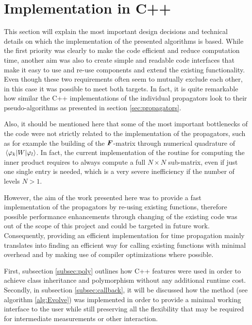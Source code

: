 \section{Implementation in C++}
\label{sec:implementation}
%
This section will explain the most important design decisions and technical details on which the implementation of the presented algorithms is based.
While the first priority was clearly to make the code efficient and reduce computation time, another aim was also to create simple and readable code interfaces that make it easy to use and re-use components and extend the existing functionality. \\
%
Even though these two requirements often seem to mutually exclude each other, in this case it was possible to meet both targets.
In fact, it is quite remarkable how similar the C++ implementations of the individual propagators look to their pseudo-algorithms as presented in section \ref{sec:propagators}.
\par\medskip
%
Also, it should be mentioned here that some of the most important bottlenecks of the code were not strictly related to the implementation of the propagators, such as for example the building of the $\bm{F}$-matrix through numerical quadrature of $\matrixel{\varphi_k}{W}{\varphi_l}$.
In fact, the current implementation of the  routine for computing the inner product requires to always compute a full $N \times N$ sub-matrix, even if just one single entry is needed, which is a very severe inefficiency if the number of levels $N>1$.
\par\medskip
%
However, the aim of the work presented here was to provide a fast implementation of the propagators by re-using existing functions, therefore possible performance enhancements through changing of the existing code was out of the scope of this project and could be targeted in future work.
Consequently, providing an efficient implementation for time propagation mainly translates into finding an efficient way for calling existing functions with minimal overhead and by making use of compiler optimizations where possible.
\par\medskip
%
First, subsection \ref{subsec:poly} outlines how C++ features were used in order to achieve class inheritance and polymorphism without any additional runtime cost.
Secondly, in subsection \ref{subsec:callback}, it will be discussed how the  method (see algorithm \ref{alg:Evolve}) was implemented in order to provide a minimal working interface to the user while still preserving all the flexibility that may be required for intermediate measurements or other interaction.
